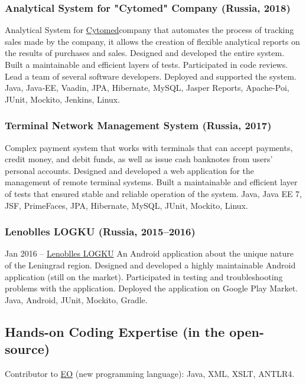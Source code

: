 \documentclass{vl}
\begin{document}
    \subsubsection*{Analytical System for "Cytomed" Company (Russia, 2018)}
    Analytical System for \href{https://cytomed.ru/en/}{Cytomed}company that automates the process of tracking sales
    made by the company, it allows the creation of flexible analytical reports on the results of purchases and sales.
    Designed and developed the entire system.
    Built a maintainable and efficient layers of tests.
    Participated in code reviews.
    Lead a team of several software developers.
    Deployed and supported the system.
    Java, Java‐EE, Vaadin, JPA, Hibernate, MySQL, Jasper Reports, Apache-Poi, JUnit, Mockito, Jenkins, Linux.

    \subsubsection*{Terminal Network Management System (Russia, 2017)}
    Complex payment system that works with terminals that can accept payments, credit money, and debit funds,
    as well as issue cash banknotes from users' personal accounts.
    Designed and developed a web application for the management of remote terminal systems.
    Built a maintainable and efficient layer of tests that ensured stable and reliable operation of the system.
    Java, Java EE 7, JSF, PrimeFaces, JPA, Hibernate, MySQL, JUnit, Mockito, Linux.

    \subsubsection*{Lenoblles LOGKU (Russia, 2015--2016)}
    Jan 2016 – \href{https://play.google.com/store/apps/details?id=com.altinntech.oopt_lo}{Lenoblles LOGKU}
    An Android application about the unique nature of the Leningrad region.
    Designed and developed a highly maintainable Android application (still on the market).
    Participated in testing and troubleshooting problems with the application.
    Deployed the application on Google Play Market.
    Java, Android, JUnit, Mockito, Gradle.

    \subsection*{Hands-on Coding Expertise (in the open-source)}

    Contributor to \href{https://www.eolang.org}{EO} (new programming language):
    Java, XML, XSLT, ANTLR4.
\end{document}
